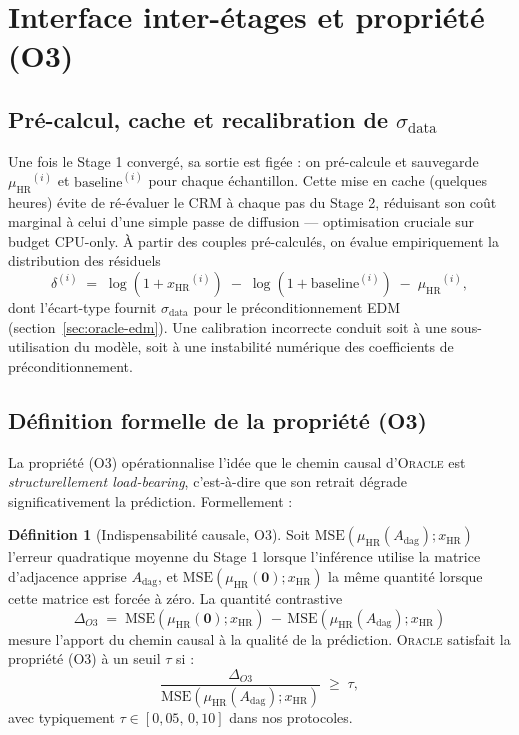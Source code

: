 \documentclass[14pt,a4paper,openany]{extreport}
\theoremstyle{definition}
\newtheorem{definition}{Définition}[chapter]
\newcommand{\Oracle}{\textsc{Oracle}}
\newcommand{\HR}{\ensuremath{\text{HR}}}
\newcommand{\xHR}{\ensuremath{x_{\HR}}}
\newcommand{\muHR}{\ensuremath{\mu_{\HR}}}
\newcommand{\Adag}{\ensuremath{A_{\mathrm{dag}}}}
\begin{document}
\section{Interface inter-étages et propriété (O3)}
\label{sec:oracle-o3}

\subsection{Pré-calcul, cache et recalibration de $\sigma_{\mathrm{data}}$}
\label{ssec:oracle-cache}

Une fois le Stage 1 convergé, sa sortie est figée : on pré-calcule et sauvegarde $\muHR^{(i)}$ et $\mathrm{baseline}^{(i)}$ pour chaque échantillon. Cette mise en cache (quelques heures) évite de ré-évaluer le CRM à chaque pas du Stage 2, réduisant son coût marginal à celui d'une simple passe de diffusion — optimisation cruciale sur budget CPU-only. À partir des couples pré-calculés, on évalue empiriquement la distribution des résiduels
\begin{equation}
  \delta^{(i)} \;=\; \log(1 + \xHR^{(i)}) \;-\; \log(1 + \mathrm{baseline}^{(i)}) \;-\; \muHR^{(i)},
  \label{eq:residu}
\end{equation}
dont l'écart-type fournit $\sigma_{\mathrm{data}}$ pour le préconditionnement EDM (section~\ref{sec:oracle-edm}). Une calibration incorrecte conduit soit à une sous-utilisation du modèle, soit à une instabilité numérique des coefficients de préconditionnement.

\subsection{Définition formelle de la propriété (O3)}
\label{ssec:oracle-o3-def}

La propriété (O3) opérationnalise l'idée que le chemin causal d'\Oracle{} est \emph{structurellement load-bearing}, c'est-à-dire que son retrait dégrade significativement la prédiction. Formellement :

\begin{definition}[Indispensabilité causale, O3]\label{def:o3}
Soit $\mathrm{MSE}\!\left( \muHR(\Adag); \xHR \right)$ l'erreur quadratique moyenne du Stage 1 lorsque l'inférence utilise la matrice d'adjacence apprise $\Adag$, et $\mathrm{MSE}\!\left( \muHR(\mathbf{0}); \xHR \right)$ la même quantité lorsque cette matrice est forcée à zéro. La quantité contrastive
\begin{equation}
  \Delta_{O3} \;=\; \mathrm{MSE}\!\left( \muHR(\mathbf{0}); \xHR \right) \,-\, \mathrm{MSE}\!\left( \muHR(\Adag); \xHR \right)
  \label{eq:delta-o3}
\end{equation}
mesure l'apport du chemin causal à la qualité de la prédiction. \Oracle{} satisfait la propriété (O3) à un seuil $\tau$ si :
\begin{equation}
  \frac{\Delta_{O3}}{\mathrm{MSE}\!\left( \muHR(\Adag); \xHR \right)} \;\geq\; \tau,
  \label{eq:o3-criterion}
\end{equation}
avec typiquement $\tau \in [0{,}05,\, 0{,}10]$ dans nos protocoles.
\end{definition}
\end{document}
